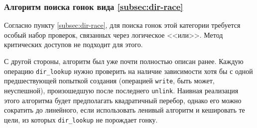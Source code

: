 \subsubsection{Алгоритм поиска гонок вида \ref{subsec:dir-race}}

Согласно пункту \ref{subsec:dir-race}, для поиска гонок этой категории требуется особый набор проверок, связанных через логическое <<или>>. Метод критических доступов не подходит для этого. 

С другой стороны, алгоритм был уже почти полностью описан ранее. Каждую операцию \texttt{dir\_lookup} нужно проверить на наличие зависимости хотя бы с одной предшествующей попыткой создания (операцией \texttt{write}, быть может, неуспешной), произошедшую после последнего \texttt{unlink}. Наивная реализация этого алгоритма будет предполагать квадратичный перебор, однако его можно сократить до линейного, если использовать ленивый алгоритм и кешировать те цели, из которых \texttt{dir\_lookup} не порождает гонку.
